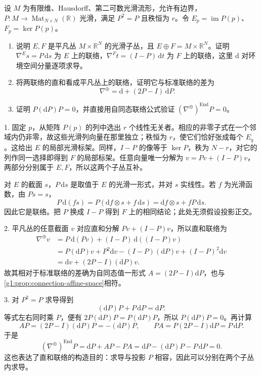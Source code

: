 \begin{exercise}\label{g1:ex:projection-induced-connection}
	设 \(M\) 为有限维、Hausdorff、第二可数光滑流形，允许有边界，\(P:M\to\operatorname{Mat}_{N\times N}(\mathbb R)\) 光滑，满足 \(P^2=P\) 且秩恒为 \(r\)。令 \(E_p=\operatorname{im}P(p)\)、\(F_p=\ker P(p)\)。
	\begin{enumerate}
		\item 说明 \(E,F\) 是平凡丛 \(M\times\mathbb R^N\) 的光滑子丛，且 \(E\oplus F=M\times\mathbb R^N\)。证明 \(\nabla^Es=P\,\mathrm{d}s\) 为 \(E\) 上的联络，\(\nabla^Ft=(I-P)\,\mathrm{d}t\) 为 \(F\) 上的联络，这里 \(\mathrm{d}\) 对环境空间分量逐项求导。
		\item 将两联络的直和看成平凡丛上的联络，证明它与标准联络的差为
		\[
			\nabla^\oplus=\mathrm{d}+(2P-I)\,\mathrm{d}P.
		\]
		\item 证明 \(P(\mathrm{d}P)P=0\)，并直接用自同态联络公式验证 \((\nabla^\oplus)^{\operatorname{End}}P=0\)。
	\end{enumerate}
\end{exercise}
\begin{solution}
	1. 固定 \(p\)，从矩阵 \(P(p)\) 的列中选出 \(r\) 个线性无关者。相应的非零子式在一个邻域内仍非零，故这些光滑列向量在那里独立；秩恒为 \(r\)，使它们恰好张成每个 \(E_q\)。这给出 \(E\) 的局部光滑标架。同样，\(I-P\) 的像等于 \(\ker P\)，秩为 \(N-r\)，对它的列作同一选择即得到 \(F\) 的局部标架。任意向量唯一分解为 \(v=Pv+(I-P)v\)，两部分分别属于 \(E,F\)，所以这两个子丛互补。

	对 \(E\) 的截面 \(s\)，\(P\,\mathrm{d}s\) 是取值于 \(E\) 的光滑一形式，并对 \(s\) 实线性。若 \(f\) 为光滑函数，由 \(Ps=s\)，
	\[
		P\,\mathrm{d}(fs)=P(\mathrm{d}f\otimes s+f\,\mathrm{d}s)
		=\mathrm{d}f\otimes s+fP\,\mathrm{d}s.
	\]
	因此它是联络。把 \(P\) 换成 \(I-P\) 得到 \(F\) 上的相同结论；此处无须假设投影正交。

	2. 平凡丛的任意截面 \(v\) 对应直和分解 \(Pv+(I-P)v\)，所以直和联络为
	\begin{align*}
		\nabla^\oplus v
		&=P\,\mathrm{d}(Pv)+(I-P)\,\mathrm{d}((I-P)v)\\
		&=P(\mathrm{d}P)v+P^2\mathrm{d}v-(I-P)(\mathrm{d}P)v+(I-P)^2\mathrm{d}v\\
		&=\mathrm{d}v+(2P-I)(\mathrm{d}P)v.
	\end{align*}
	故其相对于标准联络的差确为自同态值一形式 \(A=(2P-I)\mathrm{d}P\)，也与\cref{g1:prop:connection-affine-space}相符。

	3. 对 \(P^2=P\) 求导得到
	\[
		(\mathrm{d}P)P+P\,\mathrm{d}P=\mathrm{d}P.
	\]
	等式左右同时乘 \(P\)，便有 \(2P(\mathrm{d}P)P=P(\mathrm{d}P)P\)，所以 \(P(\mathrm{d}P)P=0\)。再计算
	\[
		AP=(2P-I)(\mathrm{d}P)P=-(\mathrm{d}P)P,\qquad
		PA=P(2P-I)\mathrm{d}P=P\,\mathrm{d}P.
	\]
	于是
	\[
		(\nabla^\oplus)^{\operatorname{End}}P
		=\mathrm{d}P+AP-PA
		=\mathrm{d}P-(\mathrm{d}P)P-P\,\mathrm{d}P=0.
	\]
	这也表达了直和联络的构造目的：求导与投影 \(P\) 相容，因此可以分别在两个子丛内求导。
\end{solution}

